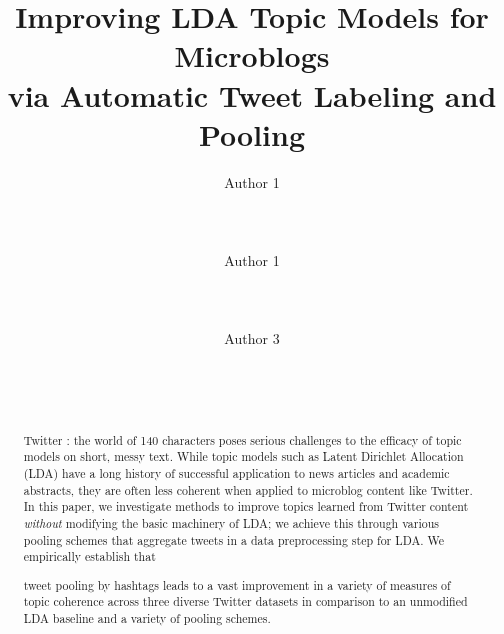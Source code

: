\documentclass{sig-alternate}
\begin{document}
\title{Improving LDA Topic Models for Microblogs\\ via Automatic Tweet Labeling and Pooling}

\author{
\alignauthor
Author 1\\
       \\
       \\
       \\
\alignauthor
Author 1\\
       \\
       \\
       \\
\alignauthor
Author 3\\
       \\
       \\
       \\
}


\maketitle
\begin{abstract}
Twitter : the world of 140 characters poses serious challenges to the efficacy of topic models on short, messy text. While topic models such as Latent Dirichlet Allocation (LDA) have a long history of successful application to news articles and academic abstracts, they are often less coherent when applied to microblog
  content like Twitter.  In this paper, we investigate methods to
  improve topics learned from Twitter content \emph{without} modifying
  the basic machinery of LDA; we achieve this through various pooling
  schemes that aggregate tweets in a data preprocessing step for LDA.
  We empirically establish that tweet pooling by hashtags leads to a vast improvement in a variety of measures of topic
  coherence across three diverse Twitter datasets in comparison to an
  unmodified LDA baseline and a variety of pooling schemes.
\end{abstract}


\end{document}
